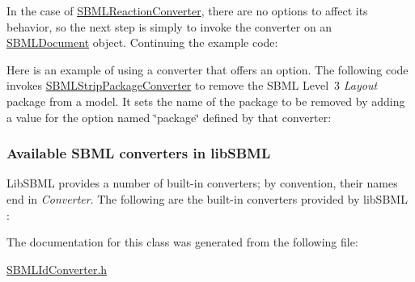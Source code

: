 In the case of \hyperlink{class_s_b_m_l_reaction_converter}{S\+B\+M\+L\+Reaction\+Converter}, there are no options to affect its behavior, so the next step is simply to invoke the converter on an \hyperlink{class_s_b_m_l_document}{S\+B\+M\+L\+Document} object. Continuing the example code\+:

Here is an example of using a converter that offers an option. The following code invokes \hyperlink{class_s_b_m_l_strip_package_converter}{S\+B\+M\+L\+Strip\+Package\+Converter} to remove the S\+B\+ML Level~3 {\itshape Layout} package from a model. It sets the name of the package to be removed by adding a value for the option named {\ttfamily \char`\"{}package\char`\"{}} defined by that converter\+:\hypertarget{classdoc__section__using__sbml__converters_available-converters}{}\subsubsection{Available S\+B\+M\+L converters in lib\+S\+B\+ML}\label{classdoc__section__using__sbml__converters_available-converters}
Lib\+S\+B\+ML provides a number of built-\/in converters; by convention, their names end in {\itshape Converter}. The following are the built-\/in converters provided by lib\+S\+B\+ML \+:

The documentation for this class was generated from the following file\+:\begin{DoxyCompactItemize}
\item 
\hyperlink{_s_b_m_l_id_converter_8h}{S\+B\+M\+L\+Id\+Converter.\+h}\end{DoxyCompactItemize}
